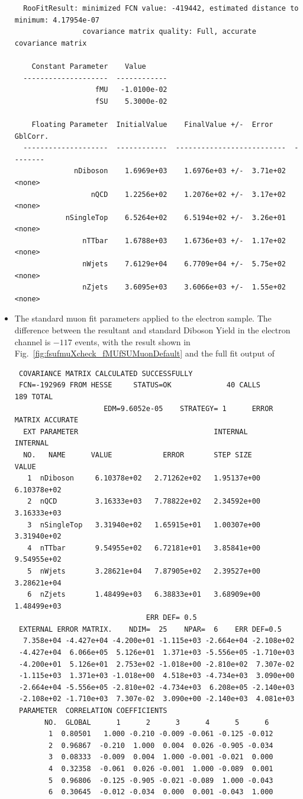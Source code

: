 \begin{itemize}
{\begin{verbatim}
  RooFitResult: minimized FCN value: -419442, estimated distance to minimum: 4.17954e-07
                covariance matrix quality: Full, accurate covariance matrix

    Constant Parameter    Value     
  --------------------  ------------
                   fMU   -1.0100e-02
                   fSU    5.3000e-02

    Floating Parameter  InitialValue    FinalValue +/-  Error     GblCorr.
  --------------------  ------------  --------------------------  --------
              nDiboson    1.6969e+03    1.6976e+03 +/-  3.71e+02  <none>
                  nQCD    1.2256e+02    1.2076e+02 +/-  3.17e+02  <none>
            nSingleTop    6.5264e+02    6.5194e+02 +/-  3.26e+01  <none>
                nTTbar    1.6788e+03    1.6736e+03 +/-  1.17e+02  <none>
                nWjets    7.6129e+04    6.7709e+04 +/-  5.75e+02  <none>
                nZjets    3.6095e+03    3.6066e+03 +/-  1.55e+02  <none>

\end{verbatim}
}


\item The standard muon fit parameters applied to the electron sample. The difference between the resultant and standard Diboson Yield in the electron channel is $-117$ events, with the result shown in Fig.~\ref{fig:fsufmuXcheck_fMUfSUMuonDefault} and the full fit output of
{\tiny
\begin{verbatim}
 COVARIANCE MATRIX CALCULATED SUCCESSFULLY
 FCN=-192969 FROM HESSE     STATUS=OK             40 CALLS         189 TOTAL
                     EDM=9.6052e-05    STRATEGY= 1      ERROR MATRIX ACCURATE 
  EXT PARAMETER                                INTERNAL      INTERNAL  
  NO.   NAME      VALUE            ERROR       STEP SIZE       VALUE   
   1  nDiboson     6.10378e+02   2.71262e+02   1.95137e+00   6.10378e+02
   2  nQCD         3.16333e+03   7.78822e+02   2.34592e+00   3.16333e+03
   3  nSingleTop   3.31940e+02   1.65915e+01   1.00307e+00   3.31940e+02
   4  nTTbar       9.54955e+02   6.72181e+01   3.85841e+00   9.54955e+02
   5  nWjets       3.28621e+04   7.87905e+02   2.39527e+00   3.28621e+04
   6  nZjets       1.48499e+03   6.38833e+01   3.68909e+00   1.48499e+03
                               ERR DEF= 0.5
 EXTERNAL ERROR MATRIX.    NDIM=  25    NPAR=  6    ERR DEF=0.5
  7.358e+04 -4.427e+04 -4.200e+01 -1.115e+03 -2.664e+04 -2.108e+02 
 -4.427e+04  6.066e+05  5.126e+01  1.371e+03 -5.556e+05 -1.710e+03 
 -4.200e+01  5.126e+01  2.753e+02 -1.018e+00 -2.810e+02  7.307e-02 
 -1.115e+03  1.371e+03 -1.018e+00  4.518e+03 -4.734e+03  3.090e+00 
 -2.664e+04 -5.556e+05 -2.810e+02 -4.734e+03  6.208e+05 -2.140e+03 
 -2.108e+02 -1.710e+03  7.307e-02  3.090e+00 -2.140e+03  4.081e+03 
 PARAMETER  CORRELATION COEFFICIENTS  
       NO.  GLOBAL      1      2      3      4      5      6
        1  0.80501   1.000 -0.210 -0.009 -0.061 -0.125 -0.012
        2  0.96867  -0.210  1.000  0.004  0.026 -0.905 -0.034
        3  0.08333  -0.009  0.004  1.000 -0.001 -0.021  0.000
        4  0.32358  -0.061  0.026 -0.001  1.000 -0.089  0.001
        5  0.96806  -0.125 -0.905 -0.021 -0.089  1.000 -0.043
        6  0.30645  -0.012 -0.034  0.000  0.001 -0.043  1.000


\end{verbatim}}
\end{itemize}
